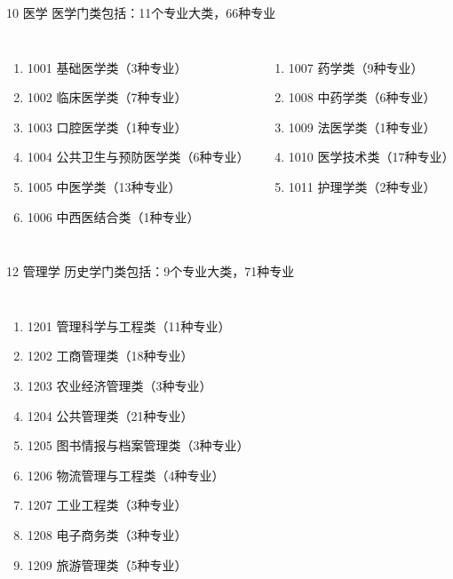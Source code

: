 \documentclass[aspectratio=169]{ctexbeamer} %
\begin{document}
\begin{frame}[t]{10 医学}
医学门类包括：11个专业大类，66种专业 \\

\begin{spacing}{1.2} %
\begin{columns}
{\large
\begin{enumerate}[label={\arabic*.}]
\item 1001 基础医学类（3种专业）
\item 1002 临床医学类（7种专业）
\item 1003 口腔医学类（1种专业）
\item 1004 公共卫生与预防医学类（6种专业）
\item 1005 中医学类（13种专业）
\item 1006 中西医结合类（1种专业）
\end{enumerate} 
}
{\large
\begin{enumerate}[label={\arabic*.},start=7]
\item 1007 药学类（9种专业）
\item 1008 中药学类（6种专业）
\item 1009 法医学类（1种专业）
\item 1010 医学技术类（17种专业）
\item 1011 护理学类（2种专业）
\end{enumerate} 
}
\end{columns}
\end{spacing}
\end{frame}

\begin{frame}[t]{12 管理学}
历史学门类包括：9个专业大类，71种专业
\begin{spacing}{1.0} %
\begin{columns}
{\large
\begin{enumerate}[label={\arabic*.}]
\item 1201 管理科学与工程类（11种专业）
\item 1202 工商管理类（18种专业）
\item 1203 农业经济管理类（3种专业）
\item 1204 公共管理类（21种专业）
\item 1205 图书情报与档案管理类（3种专业）
\item 1206 物流管理与工程类（4种专业）
\item 1207 工业工程类（3种专业）
\item 1208 电子商务类（3种专业）
\item 1209 旅游管理类（5种专业）
\end{enumerate} 
}
\end{columns}
\end{spacing}
\end{frame}
\end{document}
